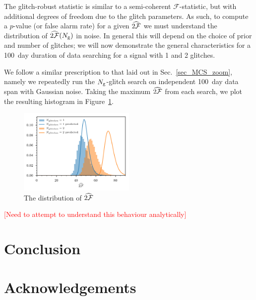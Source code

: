 \documentclass[aps, prd, twocolumn, superscriptaddress, floatfix, showpacs, nofootinbib, longbibliography]{revtex4-1}
\newcommand{\comment}[1]{\textcolor{red}{[#1]}}
\begin{document}
The glitch-robust statistic is similar to a semi-coherent
$\mathcal{F}$-statistic, but with additional degrees of freedom due to the
glitch parameters. As such, to compute a $p$-value (or false alarm rate) for a
given $\widehat{2{\mathcal{F}}}$ we must understand the distribution of $\widehat{2{\mathcal{F}}}(N_{\rm g})$
in noise. In general this will depend on the choice of prior and number of
glitches; we will now demonstrate the general characteristics for a 100~day
duration of data searching for a signal with 1 and 2 glitches.

We follow a similar prescription to that laid out in Sec.~\ref{sec_MCS_zoom},
namely we repeatedly run the $N_{\rm g}$-glitch search on independent 100~day
data span with Gaussian noise. Taking the maximum $\widehat{2{\mathcal{F}}}$ from each search,
we plot the resulting histogram in
Figure~\ref{fig_single_glitch_twoFhat_histgram}.

\begin{figure}[htb]
\centering
\includegraphics[width=0.5\textwidth]{glitch_noise_twoF_histogram}
\caption{The distribution of $\widehat{2{\mathcal{F}}}$ }
\label{fig_single_glitch_twoFhat_histgram}
\end{figure}

\comment{Need to attempt to understand this behaviour analytically}
%


\section{Conclusion}
\label{sec_conclusion}



\section{Acknowledgements}


\end{document}
